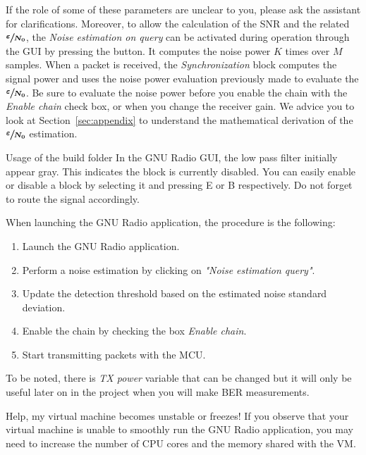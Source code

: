 If the role of some of these parameters are unclear to you, please ask the assistant for clarifications.
Moreover, to allow the calculation of the SNR and the related $\boldsymbol{\sfrac{\varepsilon}{N_0}}$, the \textit{Noise estimation on query} can be activated during operation through the GUI by pressing the button. It computes the noise power $K$ times over $M$ samples. When a packet is received, the \textit{Synchronization}  block computes the signal power and uses the noise power evaluation previously made to evaluate the $\boldsymbol{\sfrac{\varepsilon}{N_0}}$. Be sure to evaluate the noise power before you enable the chain with the \textit{Enable chain} check box, or when you change the receiver gain. We advice you to look at Section~\ref{sec:appendix} to understand the mathematical derivation of the $\boldsymbol{\sfrac{\varepsilon}{N_0}}$ estimation.

\begin{bclogo}[couleur = gray!20, arrondi = 0.2, logo=\bcinfo]{Usage of the build folder}
    In the GNU Radio GUI, the low pass filter initially appear gray. This indicates the block is currently disabled. You can easily enable or disable a block by selecting it and pressing E or B respectively. Do not forget to route the signal accordingly.
\end{bclogo}


When launching the GNU Radio application, the procedure is the following:
\begin{enumerate}
    \item Launch the GNU Radio application.
    \item Perform a noise estimation by clicking on \textit{"Noise estimation query"}.
    \item Update the detection threshold based on the estimated noise standard deviation.
    \item Enable the chain by checking the box \textit{Enable chain}.
    \item Start transmitting packets with the MCU.
\end{enumerate}

To be noted, there is \textit{TX power} variable that can be changed but it will only be useful later on in the project when you will make BER measurements.

\begin{bclogo}[couleur = gray!20, arrondi = 0.2, logo=\bcinfo]{Help, my virtual machine becomes unstable or freezes!}
    If you observe that your virtual machine is unable to smoothly run the GNU Radio application, you may need to increase the number
    of CPU cores and the memory shared with the VM.
\end{bclogo}

